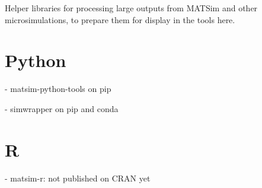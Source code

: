 Helper libraries for processing large outputs from MATSim and other microsimulations, to prepare them for display in the tools here.

\section{Python}
\label{appendix-python}

- matsim-python-tools on pip

- simwrapper on pip and conda

\section{R}
\label{appendix-r}

- matsim-r: not published on CRAN yet
